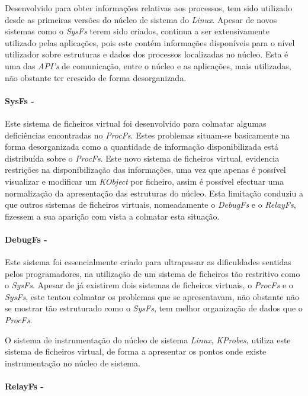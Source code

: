 Desenvolvido para obter informações relativas aos processos, tem sido utilizado desde as primeiras versões do núcleo de sistema do \textit{Linux}.
Apesar de novos sistemas como o \textit{SysFs} terem sido criados, continua a ser extensivamente utilizado pelas aplicações, pois este contém informações disponíveis para o nível utilizador sobre estruturas e dados dos processos localizadas no núcleo.
Esta é uma das \textit{API's} de comunicação, entre o núcleo e as aplicações, mais utilizadas, não obstante ter crescido de forma desorganizada.

\paragraph*{SysFs - }\label{cap:SysFs_overview}

Este sistema de ficheiros virtual foi desenvolvido para colmatar algumas deficiências encontradas no \textit{ProcFs}.
Estes problemas situam-se basicamente na forma desorganizada como a quantidade de informação disponibilizada está distribuída sobre o \textit{ProcFs}.
Este novo sistema de ficheiros virtual, evidencia restrições na disponibilização das informações, uma vez que apenas é possível visualizar e modificar um \textit{KObject} por ficheiro, assim é possível efectuar uma normalização da apresentação das estruturas do núcleo.
Esta limitação conduziu a que outros sistemas de ficheiros virtuais, nomeadamente o \textit{DebugFs} e o \textit{RelayFs}, fizessem a sua aparição com vista a colmatar esta situação.

\paragraph*{DebugFs - }\label{cap:DebugFs_overview}

Este sistema foi essencialmente criado para ultrapassar as dificuldades sentidas pelos programadores, na utilização de um sistema de ficheiros tão restritivo como o \textit{SysFs}.
Apesar de já existirem dois sistemas de ficheiros virtuais, o \textit{ProcFs} e o \textit{SysFs}, este tentou colmatar os problemas que se apresentavam, não obstante não se mostrar tão estruturado como o \textit{SysFs}, tem melhor organização de dados que o \textit{ProcFs}.

O sistema de instrumentação do núcleo de sistema \textit{Linux}, \textit{KProbes}, utiliza este sistema de ficheiros virtual, de forma a apresentar os pontos onde existe instrumentação no núcleo de sistema.

\paragraph*{RelayFs - }\label{cap:RelayFs_overview}

